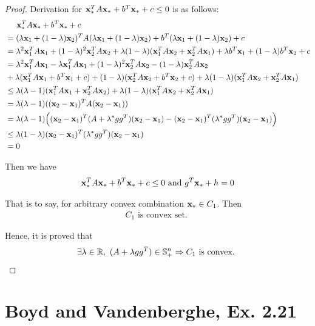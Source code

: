 \documentclass[11pt,a4paper]{article}
\begin{document}
\begin{proof}
    Derivation for $\mathbf{x}_{*}^{T} A \mathbf{x}_{*} + b^T \mathbf{x}_{*} + c \leq 0$ is as follows:
    \begin{align}
        & \hspace{0.5cm} \mathbf{x}_{*}^{T} A \mathbf{x}_{*} + b^T \mathbf{x}_{*} + c  \\
        & = (\lambda \mathbf{x}_{1} + (1-\lambda) \mathbf{x}_{2})^{T} A (\lambda \mathbf{x}_{1} + (1-\lambda) \mathbf{x}_{2}) + b^T (\lambda \mathbf{x}_{1} + (1-\lambda) \mathbf{x}_{2}) + c \\
        & = \lambda^2 \mathbf{x}_{1}^{T} A \mathbf{x}_{1} + (1-\lambda)^2 \mathbf{x}_{2}^{T} A \mathbf{x}_{2} 
        + \lambda(1-\lambda) (\mathbf{x}_{1}^{T} A \mathbf{x}_{2} + \mathbf{x}_{2}^{T} A \mathbf{x}_{1})
        + \lambda b^T \mathbf{x}_{1} + (1-\lambda) b^T \mathbf{x}_{2} + c \\
        & = \lambda^2 \mathbf{x}_{1}^{T} A \mathbf{x}_{1} - \lambda \mathbf{x}_{1}^{T} A \mathbf{x}_{1} 
        + (1-\lambda)^2 \mathbf{x}_{2}^{T} A \mathbf{x}_{2} - (1-\lambda) \mathbf{x}_{2}^{T} A \mathbf{x}_{2}
        \nonumber \\
        & + \lambda(\mathbf{x}_{1}^{T} A \mathbf{x}_{1} + b^T \mathbf{x}_{1} + c) + (1-\lambda)(\mathbf{x}_{2}^{T} A \mathbf{x}_{2} + b^T \mathbf{x}_{2} + c) 
        + \lambda(1-\lambda) (\mathbf{x}_{1}^{T} A \mathbf{x}_{2} + \mathbf{x}_{2}^{T} A \mathbf{x}_{1}) \\
        & \leq \lambda (\lambda - 1) (\mathbf{x}_{1}^{T} A \mathbf{x}_{1} + \mathbf{x}_{2}^{T} A \mathbf{x}_{2}) 
        + \lambda(1-\lambda) (\mathbf{x}_{1}^{T} A \mathbf{x}_{2} + \mathbf{x}_{2}^{T} A \mathbf{x}_{1}) \\
        & = \lambda(\lambda - 1) ((\mathbf{x}_{2} - \mathbf{x}_{1})^{T} A (\mathbf{x}_{2} - \mathbf{x}_{1})) \\
        & = \lambda(\lambda - 1) \Big( (\mathbf{x}_{2} - \mathbf{x}_{1})^{T} (A + \lambda^{*} gg^T) (\mathbf{x}_{2} - \mathbf{x}_{1})
        - (\mathbf{x}_{2} - \mathbf{x}_{1})^{T} (\lambda^{*} gg^T) (\mathbf{x}_{2} - \mathbf{x}_{1}) \Big) \\
        & \leq \lambda(1 - \lambda) (\mathbf{x}_{2} - \mathbf{x}_{1})^{T} (\lambda^{*} gg^T) (\mathbf{x}_{2} - \mathbf{x}_{1})  \\
        & = 0
    \end{align}

    Then we have 
    \begin{align}
        \mathbf{x}_{*}^{T} A \mathbf{x}_{*} + b^T \mathbf{x}_{*} + c \leq 0 \text{ and } g^T \mathbf{x}_{*} + h = 0 
    \end{align}
    
    That is to say, for arbitrary convex combination $\mathbf{x}_{*} \in C_1$. Then 
    \begin{align}
        C_1 \text{ is convex set. }
    \end{align}

    Hence, it is proved that 
    \begin{align}
        \exists \lambda \in \mathbb{R},\ (A + \lambda gg^T) \in \mathbb{S}_{+}^{n} \Rightarrow C_1
        \text{ is convex. }
    \end{align}

\end{proof}
    

\newpage
\section{Boyd and Vandenberghe, Ex. 2.21}
\end{document}
